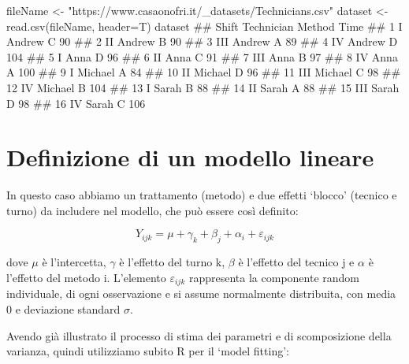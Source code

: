 \documentclass[a4paper,12pt,oneside]{book}
\newenvironment{Shaded}{\begin{snugshade}}{\end{snugshade}}
\newcommand{\StringTok}[1]{#1}
\newcommand{\DocumentationTok}[1]{#1}
\newcommand{\OtherTok}[1]{#1}
\newcommand{\FunctionTok}[1]{#1}
\newcommand{\AttributeTok}[1]{#1}
\newcommand{\NormalTok}[1]{#1}
\begin{document}
\begin{Shaded}
\begin{Highlighting}[]
\NormalTok{fileName }\OtherTok{\textless{}{-}} \StringTok{"https://www.casaonofri.it/\_datasets/Technicians.csv"}
\NormalTok{dataset }\OtherTok{\textless{}{-}} \FunctionTok{read.csv}\NormalTok{(fileName, }\AttributeTok{header=}\NormalTok{T)}
\NormalTok{dataset}
\DocumentationTok{\#\#    Shift Technician Method Time}
\DocumentationTok{\#\# 1      I     Andrew      C   90}
\DocumentationTok{\#\# 2     II     Andrew      B   90}
\DocumentationTok{\#\# 3    III     Andrew      A   89}
\DocumentationTok{\#\# 4     IV     Andrew      D  104}
\DocumentationTok{\#\# 5      I       Anna      D   96}
\DocumentationTok{\#\# 6     II       Anna      C   91}
\DocumentationTok{\#\# 7    III       Anna      B   97}
\DocumentationTok{\#\# 8     IV       Anna      A  100}
\DocumentationTok{\#\# 9      I    Michael      A   84}
\DocumentationTok{\#\# 10    II    Michael      D   96}
\DocumentationTok{\#\# 11   III    Michael      C   98}
\DocumentationTok{\#\# 12    IV    Michael      B  104}
\DocumentationTok{\#\# 13     I      Sarah      B   88}
\DocumentationTok{\#\# 14    II      Sarah      A   88}
\DocumentationTok{\#\# 15   III      Sarah      D   98}
\DocumentationTok{\#\# 16    IV      Sarah      C  106}
\end{Highlighting}
\end{Shaded}

\hypertarget{definizione-di-un-modello-lineare-2}{%
\section{Definizione di un modello lineare}\label{definizione-di-un-modello-lineare-2}}

In questo caso abbiamo un trattamento (metodo) e due effetti `blocco' (tecnico e turno) da includere nel modello, che può essere così definito:

\[Y_{ijk} = \mu + \gamma_k + \beta_j + \alpha_i + \varepsilon_{ijk}\]

dove \(\mu\) è l'intercetta, \(\gamma\) è l'effetto del turno k, \(\beta\) è l'effetto del tecnico j e \(\alpha\) è l'effetto del metodo i. L'elemento \(\varepsilon_{ijk}\) rappresenta la componente random individuale, di ogni osservazione e si assume normalmente distribuita, con media 0 e deviazione standard \(\sigma\).

Avendo già illustrato il processo di stima dei parametri e di scomposizione della varianza, quindi utilizziamo subito R per il `model fitting':
\end{document}
